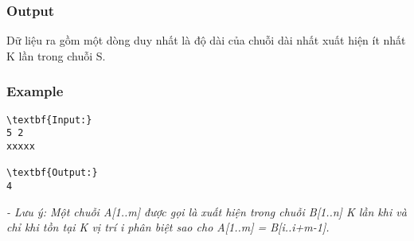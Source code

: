 \subsubsection{   Output  }

   Dữ liệu ra gồm một dòng duy nhất là độ dài của chuỗi dài nhất xuất hiện ít nhất K lần trong chuỗi S.  

\subsubsection{   Example  }
\begin{verbatim}
\textbf{Input:}
5 2
xxxxx

\textbf{Output:}
4
\end{verbatim}

\emph{    - Lưu ý: Một chuỗi A[1..m] được gọi là xuất hiện trong chuỗi B[1..n] K lần khi và chỉ khi tồn tại K vị trí i phân biệt sao cho A[1..m] = B[i..i+m-1].   }